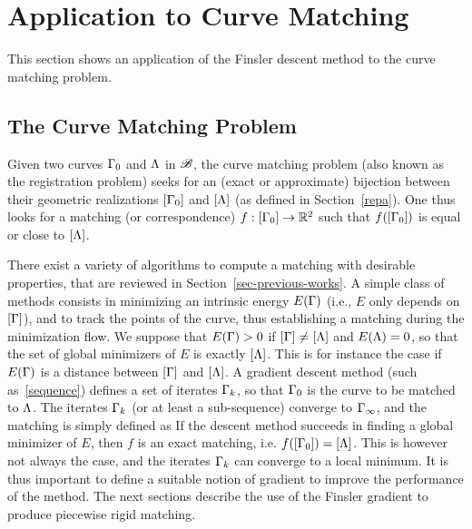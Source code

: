 \section{Application to Curve Matching}\label{CM}
	
This section shows an application of the Finsler descent method  to the curve matching problem. 

\subsection{The Curve Matching Problem}

Given two curves $\Gamma_0$ and $\Lambda$ in $\mathcal{B}$, the curve matching problem (also known as the registration problem) seeks for an (exact or approximate) bijection between their geometric realizations $[\Gamma_0]$ and $[\Lambda]$ (as defined in Section~\ref{repa}). One thus looks for a matching (or correspondence) $f : [\Gamma_0] \rightarrow \mathbb{R}^2$ such that $f( [\Gamma_0] )$ is equal or close to $[\Lambda]$.

There exist a variety of algorithms to compute a matching with desirable properties, that are reviewed in Section~\ref{sec-previous-works}. A simple class of methods consists in minimizing an intrinsic  energy $E(\Gamma)$ (i.e., $E$ only depends on $[\Gamma]$), and to track the points of the curve, thus establishing a matching  during the minimization flow. We suppose that $E(\Gamma)>0$ if $[\Gamma] \neq [\Lambda]$ and $E(\Lambda)=0$, so that the set of global minimizers of $E$ is exactly $[\Lambda]$. This is for instance the case if $E(\Gamma)$ is a distance between $[\Gamma]$ and $[\Lambda]$. A gradient descent method (such as~\eqref{sequence}) defines a set of iterates $\Gamma_k$, so that $\Gamma_0$ is the curve to be matched to $\Lambda$. The iterates $\Gamma_k$ (or at least a sub-sequence) converge to $\Gamma_\infty$, and the matching is simply defined as 
If the descent method succeeds in finding a global minimizer of $E$, then $f$ is an exact matching, 
i.e. $f([\Gamma_0]) = [\Lambda]$. 
This is however not always the case, and the iterates $\Gamma_k$ can converge to a local minimum. It is thus important to define a suitable notion of gradient to improve the performance of the method. The next sections describe the use of the Finsler gradient to produce piecewise rigid matching. 


